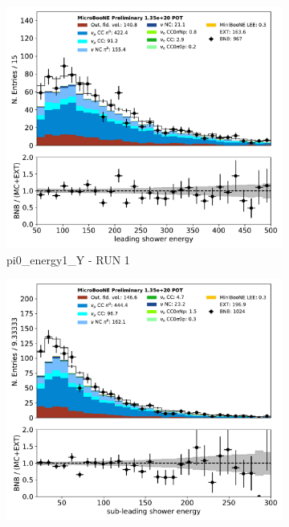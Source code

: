 \documentclass[a4paper]{article}
\begin{document}
\begin{figure}[H] 
\begin{center}
    \begin{subfigure}[b]{0.3\textwidth}
    \centering
    \includegraphics[width=1.00\textwidth]{pi0/pi0_energy1_Y_01152020_inputs_RUN1.pdf}
    \caption{\label{fig:pi0:inputs:energy1:RUN1} pi0\_energy1\_Y - RUN 1 }
    \end{subfigure}
    \begin{subfigure}[b]{0.3\textwidth}
    \centering
    \includegraphics[width=1.00\textwidth]{pi0/pi0_energy2_Y_01152020_inputs_RUN1.pdf}

\end{subfigure}
\end{center}
\end{figure}
\end{document}
